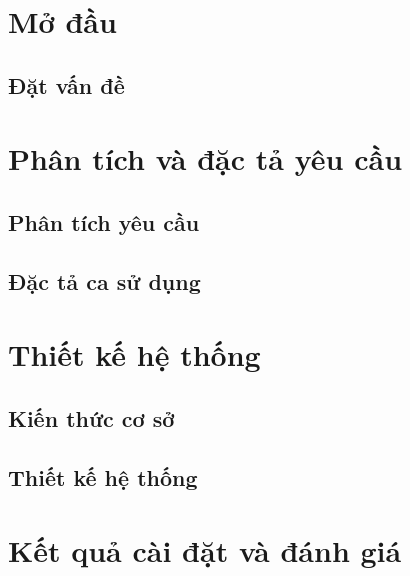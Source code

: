 \documentclass{report}
\begin{document}
\tableofcontents{}
\clearpage{}

\listoffigures{}

\listoftables{}

\chapter{Mở đầu}

\section{Đặt vấn đề}


\chapter{Phân tích và đặc tả yêu cầu}

\section{Phân tích yêu cầu}


\section{Đặc tả ca sử dụng}


\chapter{Thiết kế hệ thống}

\section{Kiến thức cơ sở}


\section{Thiết kế hệ thống}


% 

\chapter{Kết quả cài đặt và đánh giá}
\end{document}
